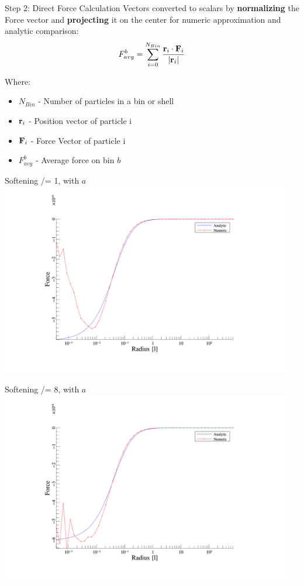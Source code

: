 \begin{frame}{Step 2: Direct Force Calculation}
	Vectors converted to scalars by \textbf{normalizing} the Force vector and \textbf{projecting} it on the center
	for numeric approximation and analytic comparison:
	\begin{equation}
		F_{avg}^b = \sum^{N_{Bin}}_{i=0} \frac{\vb{r}_i\cdot \vb{F}_i}{|\vb{r}_i|}
	\end{equation}

	{\footnotesize Where:
	\begin{itemize}
		\item $N_{Bin}$ - Number of particles in a bin or shell
		\item $\vb{r}_i$ - Position vector of particle i
		\item $\vb{F}_i$ - Force Vector of particle i
		\item $F_{avg}^b$ - Average force on bin $b$
	\end{itemize}
	}
\end{frame}

\begin{frame}{Softening /= 1, with $a$}
	\includegraphics[width=0.95\textwidth]{figures/plots/forces_a_1.png}
\end{frame}

\begin{frame}{Softening /= 8, with $a$}
	\includegraphics[width=0.95\textwidth]{figures/plots/forces_a_8.png}
\end{frame}

